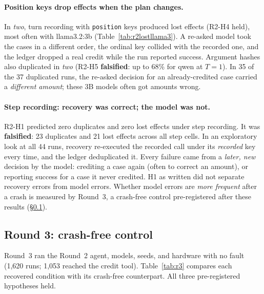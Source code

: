 \documentclass[11pt]{article}
\begin{document}
\paragraph{Position keys drop effects when the plan changes.} In \emph{two},
turn recording with \texttt{position} keys produced lost effects (R2-H4
held), most often with llama3.2:3b (Table~\ref{tab:r2lostllama3}). A
re-asked model took the cases in a different order, the ordinal key
collided with the recorded one, and the ledger dropped a real credit while
the run reported success. Argument hashes also duplicated in \emph{two}
(R2-H5 \textbf{falsified}: up to 68\% for qwen at $T{=}1$). In 35 of the 37
duplicated runs, the re-asked decision for an already-credited case carried
a \emph{different amount}; these 3B models often got amounts wrong.

\paragraph{Step recording: recovery was correct; the model was not.} R2-H1
predicted zero duplicates and zero lost effects under step recording. It was
\textbf{falsified}: 23 duplicates and 21 lost effects across all step
cells. In an exploratory look at all 44 runs, recovery re-executed the
recorded call under its \emph{recorded} key every time, and the ledger
deduplicated it. Every failure came from a \emph{later, new} decision by the
model: crediting a case again (often to correct an amount), or reporting
success for a case it never credited. H1 as written did not separate
recovery errors from model errors. Whether model errors are \emph{more
frequent} after a crash is measured by Round~3, a crash-free control
pre-registered after these results (\S\ref{sec:r3}).

\subsection{Round 3: crash-free control}
\label{sec:r3}
Round~3 ran the Round~2 agent, models, seeds, and hardware with no fault
(1,620 runs; 1,053 reached the credit tool). Table~\ref{tab:r3} compares each
recovered condition with its crash-free counterpart. All three
pre-registered hypotheses held.
\end{document}
